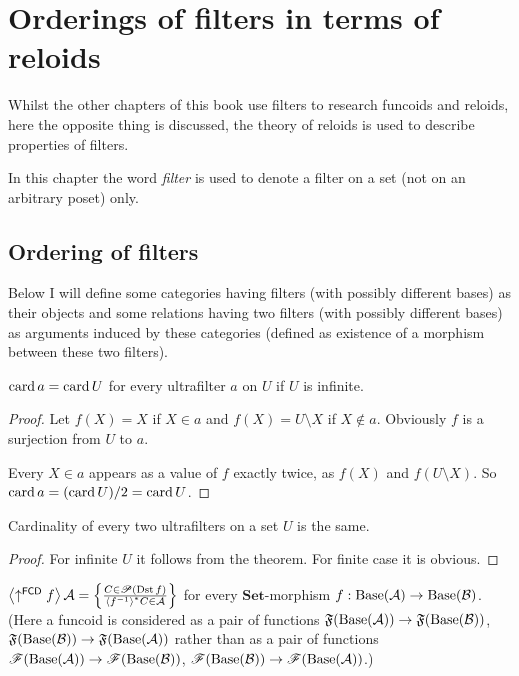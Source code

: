 \chapter{Orderings of filters in terms of reloids}

Whilst the other chapters of this book use filters to research funcoids
and reloids, here the opposite thing is discussed, the theory of reloids
is used to describe properties of filters.

In this chapter the word \emph{filter} is used to denote a filter
on a set (not on an arbitrary poset) only.

\section{Ordering of filters}

Below I will define some categories having filters (with possibly
different bases) as their objects and some relations having two filters
(with possibly different bases) as arguments induced by these categories
(defined as existence of a morphism between these two filters).
\begin{thm}
$\operatorname{card} a=\operatorname{card} U$ for every ultrafilter $a$ on $U$ if $U$ is infinite.\end{thm}
\begin{proof}
Let $f(X)=X$ if $X\in a$ and $f(X)=U\setminus X$ if $X\notin a$.
Obviously $f$ is a surjection from $U$ to $a$.

Every $X\in a$ appears as a value of $f$ exactly twice, as $f(X)$
and $f(U\setminus X)$. So $\operatorname{card} a=(\operatorname{card} U)/2=\operatorname{card} U$.\end{proof}
\begin{cor}
Cardinality of every two ultrafilters on a set $U$ is the same.\end{cor}
\begin{proof}
For infinite $U$ it follows from the theorem. For finite case it
is obvious.\end{proof}
\begin{prop}
$\left\langle \uparrow^{\mathsf{FCD}}f\right\rangle\mathcal{A}=\left\{ \frac{C\in\mathscr{P}(\operatorname{Dst} f)}{\left\langle f^{-1}\right\rangle ^{\ast}C\in\mathcal{A}}\right\}$
for every $\mathbf{Set}$-morphism $f:\operatorname{Base}(\mathcal{A})\rightarrow\operatorname{Base}(\mathcal{B})$.
(Here a funcoid is considered as a pair of functions $\mathfrak{F}(\operatorname{Base}(\mathcal{A}))\rightarrow\mathfrak{F}(\operatorname{Base}(\mathcal{B}))$,
$\mathfrak{F}(\operatorname{Base}(\mathcal{B}))\rightarrow\mathfrak{F}(\operatorname{Base}(\mathcal{A}))$
rather than as a pair of functions $\mathscr{F}(\operatorname{Base}(\mathcal{A}))\rightarrow\mathscr{F}(\operatorname{Base}(\mathcal{B}))$,
$\mathscr{F}(\operatorname{Base}(\mathcal{B}))\rightarrow\mathscr{F}(\operatorname{Base}(\mathcal{A}))$.)\end{prop}
